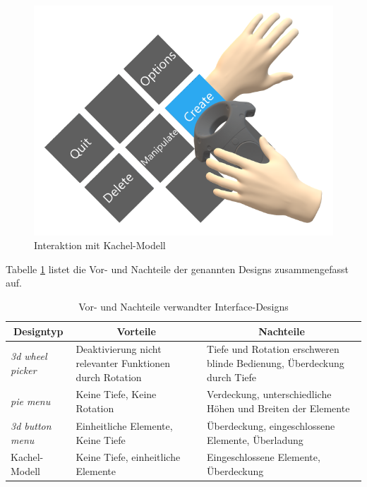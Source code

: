 \begin{figure}[h]
\captionsetup{width=.7\linewidth}
\includegraphics[scale=0.5]{Bilder/Hauptteil/konzept17}
\centering
\caption{Interaktion mit Kachel-Modell}
\label{fig:kachelmodell}
\end{figure}

\noindent Tabelle \ref{tab:interfacedesigns} listet die Vor- und Nachteile der genannten Designs zusammengefasst auf.

\begin{table}[h]
\begin{center}
	\begin{tabular}{| l | p{5cm} | p{5cm} |}
	\hline
	\multicolumn{1}{|c|}{\textbf{Designtyp}} & \multicolumn{1}{|c|}{\textbf{Vorteile}} & \multicolumn{1}{|c|}{\textbf{Nachteile}} \\ \hline
	\textit{3d wheel picker} & Deaktivierung nicht relevanter Funktionen durch Rotation & Tiefe und Rotation erschweren blinde Bedienung, Überdeckung durch Tiefe \\ \hline
	\textit{pie menu} & Keine Tiefe, Keine Rotation & Verdeckung, unterschiedliche Höhen und Breiten der Elemente \\ \hline
	\textit{3d button menu} & Einheitliche Elemente, Keine Tiefe & Überdeckung, eingeschlossene Elemente, Überladung \\ \hline
	Kachel-Modell & Keine Tiefe, einheitliche Elemente & Eingeschlossene Elemente, Überdeckung \\ 
	\hline
	\end{tabular}
	\caption{Vor- und Nachteile verwandter Interface-Designs}
	\label{tab:interfacedesigns}
\end{center}
\end{table}

